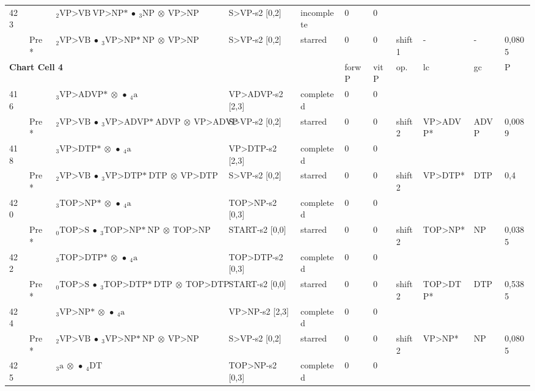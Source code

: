 \documentclass[10pt]{article}
\begin{document}
\begin{longtable}[htbp]{lllllllllll}
423 & & $ {}_2 \textrm{VP>VB} \ \textrm{VP>NP*} \  \bullet \ {}_{3} \textrm{NP} \  \otimes \ \textrm{VP>NP} $ & S>VP-s2 [0,2] & incomplete & 0 & 0 & & & & \\ 
 & Pre *& $ {}_2 \textrm{VP>VB} \  \bullet \ {}_{3} \textrm{VP>NP*} \ \textrm{NP} \  \otimes \ \textrm{VP>NP} $ & S>VP-s2 [0,2] & starred & 0 & 0 & shift1 & - & - & 0,0805 \\ 
\hline \multicolumn{5}{l}{\textbf{Chart Cell 4}} & forwP & vitP & op. & lc & gc & P \\ \hline
416 & & $ {}_3 \textrm{VP>ADVP*} \  \otimes \  \bullet \ {}_{4} \textrm{a} $ & VP>ADVP-s2 [2,3] & completed & 0 & 0 & & & & \\ 
 & Pre *& $ {}_2 \textrm{VP>VB} \  \bullet \ {}_{3} \textrm{VP>ADVP*} \ \textrm{ADVP} \  \otimes \ \textrm{VP>ADVP} $ & S>VP-s2 [0,2] & starred & 0 & 0 & shift2 & VP>ADVP* & ADVP & 0,0089 \\ 
418 & & $ {}_3 \textrm{VP>DTP*} \  \otimes \  \bullet \ {}_{4} \textrm{a} $ & VP>DTP-s2 [2,3] & completed & 0 & 0 & & & & \\ 
 & Pre *& $ {}_2 \textrm{VP>VB} \  \bullet \ {}_{3} \textrm{VP>DTP*} \ \textrm{DTP} \  \otimes \ \textrm{VP>DTP} $ & S>VP-s2 [0,2] & starred & 0 & 0 & shift2 & VP>DTP* & DTP & 0,4 \\ 
420 & & $ {}_3 \textrm{TOP>NP*} \  \otimes \  \bullet \ {}_{4} \textrm{a} $ & TOP>NP-s2 [0,3] & completed & 0 & 0 & & & & \\ 
 & Pre *& $ {}_0 \textrm{TOP>S} \  \bullet \ {}_{3} \textrm{TOP>NP*} \ \textrm{NP} \  \otimes \ \textrm{TOP>NP} $ & START-s2 [0,0] & starred & 0 & 0 & shift2 & TOP>NP* & NP & 0,0385 \\ 
422 & & $ {}_3 \textrm{TOP>DTP*} \  \otimes \  \bullet \ {}_{4} \textrm{a} $ & TOP>DTP-s2 [0,3] & completed & 0 & 0 & & & & \\ 
 & Pre *& $ {}_0 \textrm{TOP>S} \  \bullet \ {}_{3} \textrm{TOP>DTP*} \ \textrm{DTP} \  \otimes \ \textrm{TOP>DTP} $ & START-s2 [0,0] & starred & 0 & 0 & shift2 & TOP>DTP* & DTP & 0,5385 \\ 
424 & & $ {}_3 \textrm{VP>NP*} \  \otimes \  \bullet \ {}_{4} \textrm{a} $ & VP>NP-s2 [2,3] & completed & 0 & 0 & & & & \\ 
 & Pre *& $ {}_2 \textrm{VP>VB} \  \bullet \ {}_{3} \textrm{VP>NP*} \ \textrm{NP} \  \otimes \ \textrm{VP>NP} $ & S>VP-s2 [0,2] & starred & 0 & 0 & shift2 & VP>NP* & NP & 0,0805 \\ 
425 & & $ {}_3 \textrm{a} \  \otimes \  \bullet \ {}_{4} \textrm{DT} $ & TOP>NP-s2 [0,3] & completed & 0 & 0 & & & & \\ 

\end{longtable}
\end{document}
